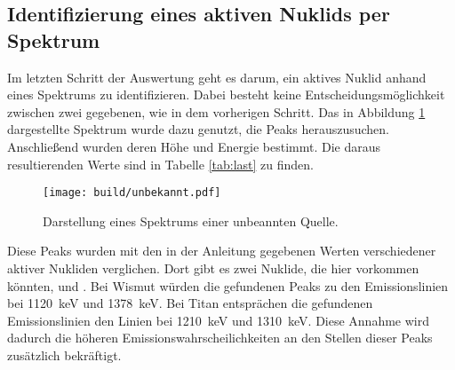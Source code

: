 \subsection{Identifizierung eines aktiven Nuklids per Spektrum}
\label{sec:Nuklidbestimmung}
Im letzten Schritt der Auswertung geht es darum, ein aktives Nuklid anhand eines
Spektrums zu identifizieren. Dabei besteht keine Entscheidungsmöglichkeit zwischen
zwei gegebenen, wie in dem vorherigen Schritt.
Das in Abbildung \ref{plt:unbekannt} dargestellte Spektrum wurde dazu genutzt, die Peaks herauszusuchen.
Anschließend wurden deren Höhe und Energie bestimmt. Die daraus
resultierenden Werte sind in Tabelle \ref{tab:last} zu finden.
\begin{figure}[htb]
  \centering
  \texttt{[image: build/unbekannt.pdf]}
  \caption{Darstellung eines Spektrums einer unbeannten Quelle.}
  \label{plt:unbekannt}
\end{figure}

\FloatBarrier
Diese Peaks wurden mit den in der Anleitung \cite{anleitung} gegebenen Werten
verschiedener aktiver Nukliden verglichen.
Dort gibt es zwei Nuklide, die hier vorkommen könnten,  und
. Bei Wismut würden die gefundenen Peaks zu den Emissionslinien
bei \SI{1120}{\kilo\electronvolt} und \SI{1378}{\kilo\electronvolt}. Bei Titan
entsprächen die gefundenen Emissionslinien den Linien bei \SI{1210}{\kilo\electronvolt}
und \SI{1310}{\kilo\electronvolt}. Diese Annahme wird dadurch die höheren
Emissionswahrscheilichkeiten an den Stellen dieser Peaks zusätzlich bekräftigt.
